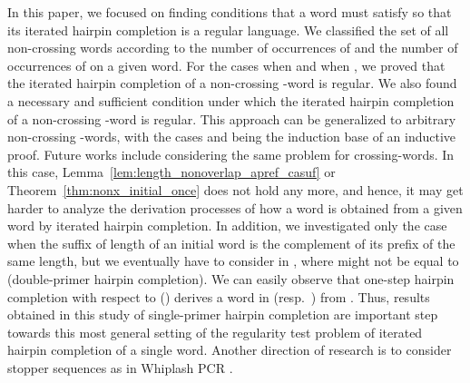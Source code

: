 \documentclass{article}
\theoremstyle{plain}
\theoremstyle{remark}
\begin{document}
In this paper, we focused on finding conditions that a word  must satisfy so that its iterated hairpin completion  is a regular language. 
We classified the set of all non-crossing words according to the number  of occurrences of  and the number  of occurrences of  on a given word. 
For the cases when  and when , we proved that the iterated hairpin completion of a non-crossing -word is regular. 
We also found a necessary and sufficient condition under which the iterated hairpin completion of a non-crossing -word is regular. 
This approach can be generalized to arbitrary non-crossing -words, with the cases  and  being the induction base of an inductive proof. 
Future works include considering the same problem for crossing-words. 
In this case, Lemma~\ref{lem:length_nonoverlap_apref_casuf} or Theorem~\ref{thm:nonx_initial_once} does not hold any more, and hence, it may get harder to analyze the derivation processes of how a word is obtained from a given word  by iterated hairpin completion. 
In addition, we investigated only the case when the suffix of length  of an initial word  is the complement of its prefix of the same length, but we eventually have to consider  in , where  might not be equal to  (double-primer hairpin completion). 
We can easily observe that one-step hairpin completion with respect to  () derives a word in  (resp.~) from . 
Thus, results obtained in this study of single-primer hairpin completion are important step towards this most general setting of the regularity test problem of iterated hairpin completion of a single word. 
Another direction of research is to consider stopper sequences as in Whiplash PCR \cite{HAKSY00, SKKGYISH99}. 



	
\end{document}
